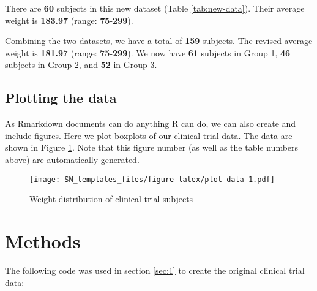 \documentclass[smallextended]{svjour3}       %
\begin{document}
There are \textbf{60} subjects in this new dataset (Table \ref{tab:new-data}). Their average weight is \textbf{183.97} (range: \textbf{75}-\textbf{299}).

Combining the two datasets, we have a total of \textbf{159} subjects. The revised average weight is \textbf{181.97} (range: \textbf{75}-\textbf{299}). We now have \textbf{61} subjects in Group 1, \textbf{46} subjects in Group 2, and \textbf{52} in Group 3.

\hypertarget{sec:2}{%
\subsection{Plotting the data}\label{sec:2}}

As Rmarkdown documents can do anything R can do, we can also create and include figures. Here we plot boxplots of our clinical trial data. The data are shown in Figure \ref{fig:plot-data}. Note that this figure number (as well as the table numbers above) are automatically generated.

\begin{figure}
\centering
\texttt{[image: SN\_templates\_files/figure-latex/plot-data-1.pdf]}
\caption{\label{fig:plot-data}Weight distribution of clinical trial subjects}
\end{figure}

\hypertarget{methods}{%
\section{Methods}\label{methods}}

The following code was used in section \ref{sec:1} to create the original clinical trial data:
\end{document}
